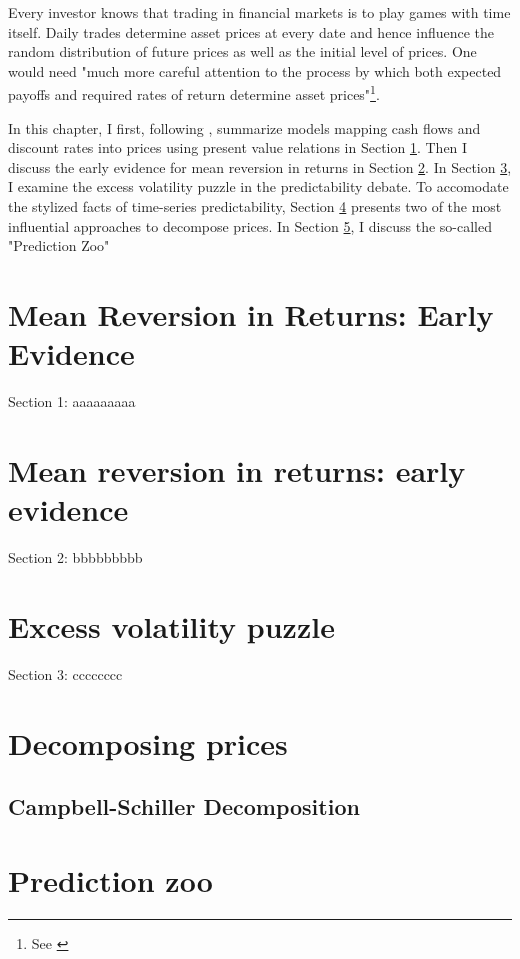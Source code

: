 \minitoc

\vspace{0.5cm}
Every investor knows that trading in financial markets is to play
games with time itself. Daily trades determine asset prices at every date and hence
influence the random distribution of future prices as well as the initial
level of prices. One would need "much more careful attention to the process
by which both expected payoffs and required rates of return determine
asset prices"\footnote{See \citet[p.~121]{campbell2017financial}}.

In this chapter, I first, following \citet[Chapter~5]{campbell2017financial}, summarize models 
mapping cash flows and discount rates into prices using present value relations in Section \ref{chap1:sec1}.
Then I discuss the early evidence for mean reversion in returns in Section \ref{chap1:sec2}.
In Section \ref{chap1:sec3}, I examine the excess volatility puzzle in the predictability debate.
To accomodate the stylized facts of time-series predictability, Section \ref{chap1:sec4}
presents two of the most influential approaches to decompose prices. In Section \ref{chap1:sec5},
I discuss the so-called "Prediction Zoo"

\section{Mean Reversion in Returns: Early Evidence}\label{chap1:sec1}
Section 1: aaaaaaaaa

\section{Mean reversion in returns: early evidence}\label{chap1:sec2}
Section 2: bbbbbbbbb

\section{Excess volatility puzzle}\label{chap1:sec3}
Section 3: cccccccc

\section{Decomposing prices}\label{chap1:sec4}
\subsection{Campbell-Schiller Decomposition}\label{chap1:sec4:ssec1}
\subsection{}

\section{Prediction zoo}\label{chap1:sec5}